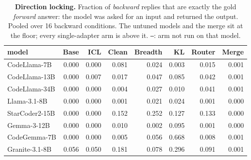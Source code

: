 \begin{table}[t]
\centering\small
\caption{\textbf{Direction locking.} Fraction of \emph{backward} replies that are exactly the gold \emph{forward} answer: the model was asked for an input and returned the output. Pooled over 16 backward conditions. The untuned models and the merge sit at the floor; every single-adapter arm is above it. \texttt{--}: arm not run on that model.}
\label{tab:dirlock}
\begin{tabular}{@{}lrrrrrrr@{}}
\toprule
model & Base & ICL & Clean & Breadth & KL & Router & Merge \\
\midrule
CodeLlama-7B & 0.000 & 0.000 & 0.081 & 0.024 & 0.003 & 0.015 & 0.001 \\
CodeLlama-13B & 0.000 & 0.007 & 0.017 & 0.047 & 0.085 & 0.042 & 0.001 \\
CodeLlama-34B & 0.000 & 0.000 & 0.004 & 0.027 & 0.010 & 0.041 & 0.001 \\
Llama-3.1-8B & 0.000 & 0.000 & 0.001 & 0.021 & 0.024 & 0.001 & 0.000 \\
StarCoder2-15B & 0.000 & 0.000 & 0.152 & 0.252 & 0.127 & 0.133 & 0.000 \\
Gemma-3-12B & 0.000 & 0.000 & 0.010 & 0.002 & 0.095 & 0.001 & 0.000 \\
CodeGemma-7B & 0.000 & 0.000 & 0.005 & 0.056 & 0.668 & 0.008 & 0.001 \\
Granite-3.1-8B & 0.056 & 0.050 & 0.181 & 0.078 & 0.296 & 0.091 & 0.001 \\
\bottomrule
\end{tabular}
\end{table}

